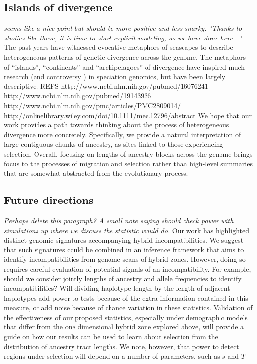 \documentclass[11pt,letterpaper]{article}
\newcommand{\alisa}[1]{{\em \color{red} #1}}
\newcommand{\plr}[1]{{\em \color{blue} #1}}
\begin{document}


\subsection*{Islands of divergence}  

\plr{seems like a nice point but should be more positive and less snarky.  "Thanks to studies like these, it is time to start explicit modeling, as we have done here..."}
The past years have witnessed evocative metaphors of seascapes to describe heterogeneous patterns of genetic divergence across the genome.  
The metaphors of ``islands'', ``continents'' and ``archipelagoes'' of divergence \citep{Turner2005, Nosil2009} have inspired much research (and controversy  \citep{Noor2009,Cruickshank2014}) in speciation genomics, but have been largely descriptive.  
REFS  http://www.ncbi.nlm.nih.gov/pubmed/16076241 http://www.ncbi.nlm.nih.gov/pubmed/19143936 http://www.ncbi.nlm.nih.gov/pmc/articles/PMC2809014/ http://onlinelibrary.wiley.com/doi/10.1111/mec.12796/abstract
We hope that our work provides a path towards thinking about the process of heterogeneous divergence more concretely. %
Specifically, we provide a natural interpretation of large contiguous chunks of ancestry, as sites linked to those experiencing selection.   
Overall, focusing on lengths of ancestry blocks across the genome brings focus to the processes of migration and selection rather than high-level summaries that are somewhat abstracted from the evolutionary process. 


\subsection*{Future directions}

\plr{Perhaps delete this paragraph? A small note saying should check power with simulations up where we discuss the statistic would do.}
Our work has highlighted distinct genomic signatures accompanying hybrid incompatibilities. 
We suggest that such signatures could be combined in an inference framework that aims to identify incompatibilities from genome scans of hybrid zones.  
However, doing so requires careful evaluation of potential signals of an incompatibility. 
For example, should we consider jointly lengths of ancestry and allele frequencies to identify incompatibilities?
Will dividing haplotype length by the length of adjacent haplotypes add power to tests because of the extra information contained in this measure, or add noise because of chance variation in these statistics.  
Validation of the effectiveness of our proposed statistics, especially under demographic models that differ from the one dimensional hybrid zone explored above, will  provide a guide on how our results can be used to learn about selection from the distribution of ancestry tract lengths. We note, however, that power to detect regions under selection will depend on a number of parameters, such as $s$ and $T$
\end{document}

